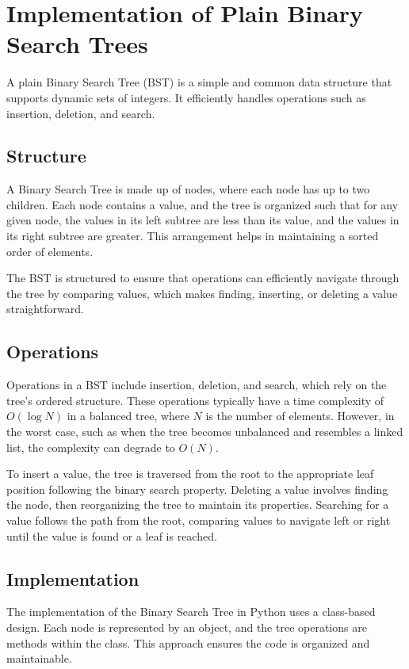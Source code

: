 \section{Implementation of Plain Binary Search Trees}

A plain Binary Search Tree (BST) is a simple and common data structure that supports dynamic sets of integers. It efficiently handles operations such as insertion, deletion, and search.

\subsection{Structure}
A Binary Search Tree is made up of nodes, where each node has up to two children. Each node contains a value, and the tree is organized such that for any given node, the values in its left subtree are less than its value, and the values in its right subtree are greater. This arrangement helps in maintaining a sorted order of elements.

The BST is structured to ensure that operations can efficiently navigate through the tree by comparing values, which makes finding, inserting, or deleting a value straightforward.



\subsection{Operations}
Operations in a BST include insertion, deletion, and search, which rely on the tree's ordered structure. These operations typically have a time complexity of \(O(\log N)\) in a balanced tree, where \(N\) is the number of elements. However, in the worst case, such as when the tree becomes unbalanced and resembles a linked list, the complexity can degrade to \(O(N)\).

To insert a value, the tree is traversed from the root to the appropriate leaf position following the binary search property. Deleting a value involves finding the node, then reorganizing the tree to maintain its properties. Searching for a value follows the path from the root, comparing values to navigate left or right until the value is found or a leaf is reached.

\subsection{Implementation}
The implementation of the Binary Search Tree in Python uses a class-based design. Each node is represented by an object, and the tree operations are methods within the class. This approach ensures the code is organized and maintainable.

